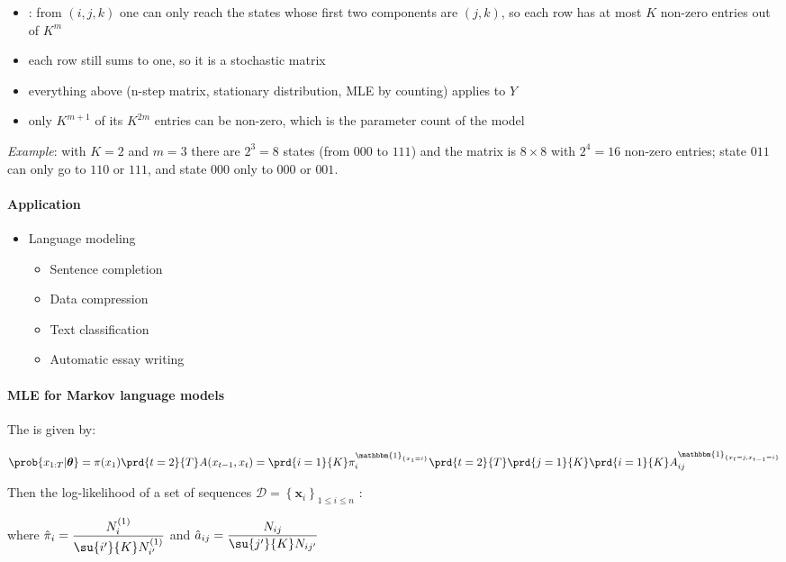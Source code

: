 \begin{itemize}
    \item {}: from $(i,j,k)$ one can only reach the states whose first two
        components are $(j,k)$, so each row has at most $K$ non-zero entries out of $K^{m}$
    \item each row still sums to one, so it is a stochastic matrix
    \item everything above (n-step matrix, stationary distribution, MLE by counting) applies to $Y$
    \item only $K^{m+1}$ of its $K^{2m}$ entries can be non-zero, which is the parameter count of the model
\end{itemize}
\emph{Example}: with $K=2$ and $m=3$ there are $2^{3}=8$ states (from $000$ to $111$) and the
matrix is $8\times8$ with $2^{4}=16$ non-zero entries; state $011$ can only go to $110$ or $111$,
and state $000$ only to $000$ or $001$.

\paragraph{Application}
\begin{itemize}
    \item Language modeling
    \begin{itemize}
        \item Sentence completion
        \item Data compression
        \item Text classification
        \item Automatic essay writing
    \end{itemize}
\end{itemize}
\paragraph{MLE for Markov language models}
The  is given by:
\begin{center}
    $
\prob{x_{1:T}|\bm{\theta}} = \pi(x_{1})\prd{t=2}{T}A(x_{t-1},x_{t}) = 
\prd{i=1}{K}\pi_{i}^{\mathbbm{1}_{\{x_{1}=i\}}}\prd{t=2}{T}\prd{j=1}{K}\prd{i=1}{K}
A_{ij}^{\mathbbm{1}_{\{x_{t}=j,x_{t-1}=i\}}}
$
\end{center}

Then the log-likelihood of a set of sequences $\mathcal{D}=\left\{\bm{x}_{i}\right\}_{1\leq i\leq n}$
:
\begin{center}
\end{center}
where $\hat{\pi}_{i}=\dfrac{N_{i}^{(1)}}{\su{i'}{K}N_{i'}^{(1)}}$ and 
$\hat{a}_{ij}=\dfrac{N_{ij}}{\su{j'}{K}N_{ij'}}$


